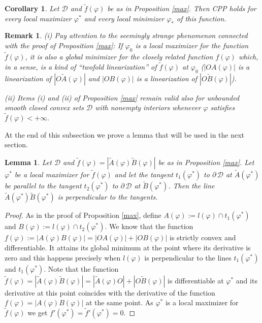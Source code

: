 \documentclass[a4paper,12pt]{amsart}
\newtheorem{lemma}[thm]{Lemma}
\newtheorem{cor}[thm]{Corollary}
\newtheorem{rem}[thm]{Remark}
\begin{document}
\medskip


\begin{cor}
Let $\mathcal D$ and $\tilde{f}(\varphi)$ be as in Proposition
\ref{max}. Then CPP holds for every local maximizer $\varphi^*$
and every local minimizer $\varphi_*$ of this function.
\end{cor}

\begin{rem} {\rm  (i)  Pay attention to the seemingly strange phenomenon connected with the proof of Proposition \ref{max}: If $\varphi_0$ is a
local maximizer for the function $\tilde{f}(\varphi)$, it is also
a global minimizer for the closely related function $f(\varphi)$
which, in a sense, is a kind of ``twofold  linearization'' of
$\tilde{f}(\varphi)$ at $\varphi_0$
($|OA(\varphi)|$ is a linearization of $|O\tilde{A}(\varphi)|$  and
$|OB(\varphi)|$ is a linearization of
$|O\tilde{B}(\varphi)|$).


(ii) Items (i) and (ii) of Proposition \ref{max} remain valid also for unbounded smooth closed convex sets $\mathcal D$ with nonempty interiors
whenever  $\varphi$ satisfies  $\tilde{f}(\varphi) < +\infty.$}
\end{rem}

At the end of this subsection we prove a lemma that will be used in the next section.

\begin{lemma} \label{observe}
Let $\mathcal D$ and $\tilde{f}(\varphi)=|\tilde{A}(\varphi)\tilde{B}(\varphi)|$
be as in Proposition \ref{max}. Let $\varphi^*$ be a local maximizer for $\tilde{f}(\varphi)$
and let the tangent $t_1(\varphi^*)$ to $\partial \, \mathcal D$ at
$\tilde{A}(\varphi^*)$ be parallel to the tangent
$t_2(\varphi^*)$ to $\partial \, \mathcal D$ at
$\tilde{B}(\varphi^*)$. Then the line $\tilde{A}(\varphi^*)\tilde{B}(\varphi^*)$ is perpendicular to the tangents.
\end{lemma}

\begin{proof}
As in the proof of Proposition \ref{max}, define
$A(\varphi):= l(\varphi)
\cap t_1(\varphi^*)$ and $B(\varphi):= l(\varphi) \cap t_2(\varphi^*)$. We know that the function
$f(\varphi):=|A(\varphi)B(\varphi)|=|OA(\varphi)| +|OB(\varphi)|$ is strictly convex and differentiable. It attains its global minimum
at the point where its derivative is zero and this happens precisely when $l(\varphi)$ is perpendicular to the lines $t_1(\varphi^*)$ and
$t_1(\varphi^*)$. Note that the function
 $\tilde{f}(\varphi) =|\tilde{A}(\varphi)\tilde{B}(\varphi)| = |\tilde{A}(\varphi)
 O| + |O \tilde{B}(\varphi)|$
 is differentiable at $\varphi^*$ and its derivative at this point coincides with the derivative of the function
 $f(\varphi)=|A(\varphi)B(\varphi)|$ at the same point. As $\varphi^*$ is a local maximizer for $\tilde{f}(\varphi)$ we get
$f'(\varphi^*) = \tilde{f}'(\varphi^*) = 0$.
 \end{proof}
\end{document}

